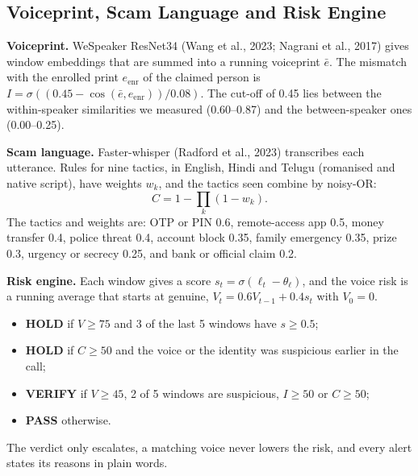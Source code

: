 \documentclass[10pt,a4paper,twocolumn]{article}
\newcommand{\llr}{\ell}
\begin{document}
\subsection{Voiceprint, Scam Language and Risk Engine}
\textbf{Voiceprint.} WeSpeaker ResNet34 (Wang et al., 2023; Nagrani et al., 2017) gives window embeddings that are summed into a running voiceprint $\bar e$. The mismatch with the enrolled print $e_{\text{enr}}$ of the claimed person is $I=\sigma((0.45-\cos(\bar e,e_{\text{enr}}))/0.08)$. The cut-off of 0.45 lies between the within-speaker similarities we measured (0.60--0.87) and the between-speaker ones (0.00--0.25).

\textbf{Scam language.} Faster-whisper (Radford et al., 2023) transcribes each utterance. Rules for nine tactics, in English, Hindi and Telugu (romanised and native script), have weights $w_k$, and the tactics seen combine by noisy-OR:
\begin{equation}
C=1-\textstyle\prod_{k}(1-w_k).
\label{eq:scam}
\end{equation}
The tactics and weights are: OTP or PIN 0.6, remote-access app 0.5, money transfer 0.4, police threat 0.4, account block 0.35, family emergency 0.35, prize 0.3, urgency or secrecy 0.25, and bank or official claim 0.2.

\textbf{Risk engine.} Each window gives a score $s_t=\sigma(\llr_t-\theta_\ell)$, and the voice risk is a running average that starts at genuine, $V_t=0.6V_{t-1}+0.4s_t$ with $V_0=0$.
\begin{itemize}\setlength\itemsep{0pt}
\item \textbf{HOLD} if $V\geq75$ and 3 of the last 5 windows have $s\geq0.5$;
\item \textbf{HOLD} if $C\geq50$ and the voice or the identity was suspicious earlier in the call;
\item \textbf{VERIFY} if $V\geq45$, 2 of 5 windows are suspicious, $I\geq50$ or $C\geq50$;
\item \textbf{PASS} otherwise.
\end{itemize}
The verdict only escalates, a matching voice never lowers the risk, and every alert states its reasons in plain words.
\end{document}
